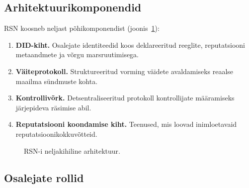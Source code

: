\documentclass[11pt,a4paper,twocolumn]{article}
\begin{document}
\subsection{Arhitektuurikomponendid}

RSN koosneb neljast põhikomponendist (joonis~\ref{fig:architecture}):
\begin{enumerate}[nosep]
\item \textbf{DID-kiht.} Osalejate identiteedid koos deklareeritud reeglite, reputatsiooni metaandmete ja võrgu marsruutimisega.
\item \textbf{Väiteprotokoll.} Struktureeritud vorming väidete avaldamiseks reaalse maailma sündmuste kohta.
\item \textbf{Kontrollivõrk.} Detsentraliseeritud protokoll kontrollijate määramiseks järjepideva räsimise abil.
\item \textbf{Reputatsiooni koondamise kiht.} Teenused, mis loovad inimloetavaid reputatsioonikokkuvõtteid.
\end{enumerate}

\begin{figure}[ht]
\centering
{}
\caption{RSN-i neljakihiline arhitektuur.}
\label{fig:architecture}
\end{figure}

\subsection{Osalejate rollid}
\end{document}
